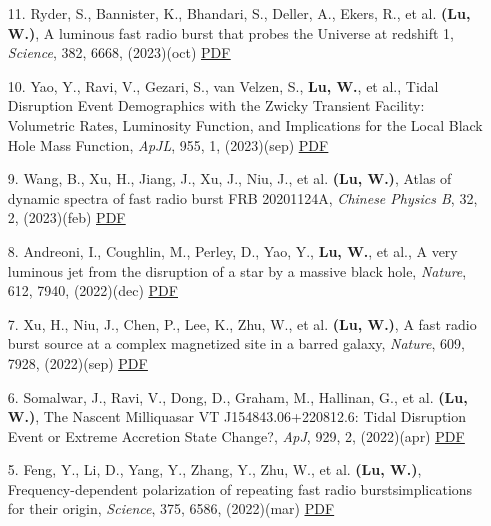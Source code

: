 \begin{itemize}[leftmargin=0.65cm]
\vspace{-0.1cm}
\item[11.]{Ryder, S., Bannister, K., Bhandari, S., Deller, A., Ekers, R., et al. {\bf (Lu, W.)}, {A luminous fast radio burst that probes the Universe at redshift 1}, {\it Science}, 382, 6668, (2023)(oct) \href{https://ui.adsabs.harvard.edu/abs/2023Sci...382..294R}{\underline{PDF}}}

\vspace{-0.1cm}
\item[10.]{Yao, Y., Ravi, V., Gezari, S., van Velzen, S., {\bf Lu, W.}, et al., {Tidal Disruption Event Demographics with the Zwicky Transient Facility: Volumetric Rates, Luminosity Function, and Implications for the Local Black Hole Mass Function}, {\it ApJL}, 955, 1, (2023)(sep) \href{https://ui.adsabs.harvard.edu/abs/2023ApJ...955L...6Y}{\underline{PDF}}}

\vspace{-0.1cm}
\item[9.]{Wang, B., Xu, H., Jiang, J., Xu, J., Niu, J., et al. {\bf (Lu, W.)}, {Atlas of dynamic spectra of fast radio burst FRB 20201124A}, {\it Chinese Physics B}, 32, 2, (2023)(feb) \href{https://ui.adsabs.harvard.edu/abs/2023ChPhB..32b9801W}{\underline{PDF}}}

\vspace{-0.1cm}
\item[8.]{Andreoni, I., Coughlin, M., Perley, D., Yao, Y., {\bf Lu, W.}, et al., {A very luminous jet from the disruption of a star by a massive black hole}, {\it Nature}, 612, 7940, (2022)(dec) \href{https://ui.adsabs.harvard.edu/abs/2022Natur.612..430A}{\underline{PDF}}}

\vspace{-0.1cm}
\item[7.]{Xu, H., Niu, J., Chen, P., Lee, K., Zhu, W., et al. {\bf (Lu, W.)}, {A fast radio burst source at a complex magnetized site in a barred galaxy}, {\it Nature}, 609, 7928, (2022)(sep) \href{https://ui.adsabs.harvard.edu/abs/2022Natur.609..685X}{\underline{PDF}}}

\vspace{-0.1cm}
\item[6.]{Somalwar, J., Ravi, V., Dong, D., Graham, M., Hallinan, G., et al. {\bf (Lu, W.)}, {The Nascent Milliquasar VT J154843.06+220812.6: Tidal Disruption Event or Extreme Accretion State Change?}, {\it ApJ}, 929, 2, (2022)(apr) \href{https://ui.adsabs.harvard.edu/abs/2022ApJ...929..184S}{\underline{PDF}}}

\vspace{-0.1cm}
\item[5.]{Feng, Y., Li, D., Yang, Y., Zhang, Y., Zhu, W., et al. {\bf (Lu, W.)}, {Frequency-dependent polarization of repeating fast radio bursts{\textemdash}implications for their origin}, {\it Science}, 375, 6586, (2022)(mar) \href{https://ui.adsabs.harvard.edu/abs/2022Sci...375.1266F}{\underline{PDF}}}


\end{itemize}
